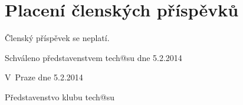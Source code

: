 \documentclass[10pt]{article}
\def \Datum {5.2.2014} %
\begin{document}
\section{Placení členských příspěvků}
	Členský příspěvek se neplatí.
%
%

	

\vspace{10mm}
Schváleno představenstvem tech@su dne \Datum

\vspace{10mm}

\hfill V~Praze dne \Datum

\hfill Představenstvo klubu tech@su
\end{document}
